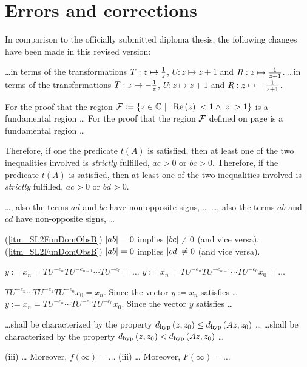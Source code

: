 \chapter{Errors and corrections}

In comparison to the officially submitted diploma thesis, the following changes have been made in this revised version:

\begin{description}
{\dots in terms of the transformations $T : z \mapsto \frac{1}{z}$, $U : z \mapsto z+1$ and $R : z \mapsto \frac{1}{z+1}$.}
{\dots in terms of the transformations $T : z \mapsto -\frac{1}{z}$, $U : z \mapsto z+1$ and $R : z \mapsto -\frac{1}{z+1}$.}

{For the proof that the region $\mathcal{F} := \{ z \in \mathbb{C} \ | \ \left|\operatorname{Re}\left(z\right)\right| < 1 \land \left|z\right| > 1 \}$ is a fundamental region \dots}
{For the proof that the region $\mathcal{F}$ defined on page \pageref{eqn_PSL2FunDom} is a fundamental region \dots}

{Therefore, if one the predicate $t(A)$ is satisfied, then at least one of the two inequalities involved is \emph{strictly} fulfilled, \ie $ac > 0$ or $bc > 0$.}
{Therefore, if the predicate $t(A)$ is satisfied, then at least one of the two inequalities involved is \emph{strictly} fulfilled, \ie $ac > 0$ or $bd > 0$.}

{\dots, \ie also the terms $ad$ and  $bc$ have non-opposite signs, \dots}
{\dots, \ie also the terms $ab$ and $cd$ have non-opposite signs, \dots}

{(\ref{itm_SL2FunDomObsB})\quad
$\left|ab\right| = 0$ implies $\left|bc\right| \ne 0$ (and vice versa).}
{(\ref{itm_SL2FunDomObsB})\quad
$\left|ab\right| = 0$ implies $\left|cd\right| \ne 0$ (and vice versa).}

{$y := x_n = TU^{-e_n} TU^{-e_{n-1}} \cdots TU^{-e_0} = \dots$}
{$y := x_n = TU^{-e_n} TU^{-e_{n-1}} \cdots TU^{-e_0} x_0 = \dots$}

{$TU^{-e_n} \cdots TU^{-e_1} TU^{-e_0} x_0 = x_n.$ \quad Since the vector $y := x_n$ satisfies \dots}
{$y := x_n = TU^{-e_n} \cdots TU^{-e_1} TU^{-e_0} x_0.$ \quad Since the vector $y$ satisfies \dots}

{\dots shall be characterized by the property $d_\text{hyp}\left({z},{z_0}\right) \le d_\text{hyp}\left({Az},{z_0}\right)$ \dots}
{\dots shall be characterized by the property $d_\text{hyp}\left({z},{z_0}\right) < d_\text{hyp}\left({Az},{z_0}\right)$ \dots}

{(iii) \dots{} Moreover, \quad $f(\infty) = \dots$}
{(iii) \dots{} Moreover, \quad $F(\infty) = \dots$}
\end{description}

